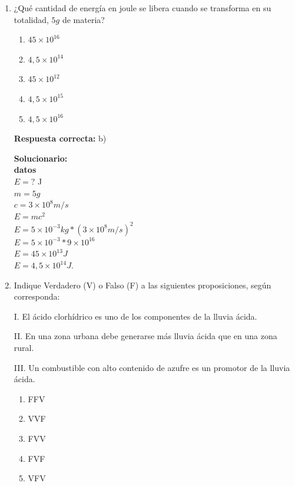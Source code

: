 \begin{enumerate}
	
	
	\item ¿Qué cantidad de energía en joule se libera cuando se transforma en su totalidad, $5g$ de materia?
	
	\begin{enumerate}[label=\alph*)]
		\item $45 \times 10^{16}$
		\item $4,5 \times 10^{14}$
		\item $45 \times 10^{12}$
		\item $4,5 \times 10^{15}$
		\item $4,5 \times 10^{16}$
	\end{enumerate}
	
	\textbf{Respuesta correcta:} b)
	
	\vspace{2mm}
	\textbf{Solucionario:}\\
	\textbf{datos} \\
	$E = ?$ J \\
	$m = 5g$ \\
	$c = 3 \times 10^8 m/s$\\

	$E = mc^2$ \\
	$E = 5 \times 10^{-3} kg * (3 \times 10^8 m/s)^2$ \\
	$E = 5 \times 10^{-3} * 9 \times 10^{16}$ \\
	$E = 45 \times 10^{13} J$ \\
	$E = 4,5 \times 10^{14} J.$
	
	\vspace{6mm}
	
	\item Indique Verdadero (V) o Falso (F) a las siguientes proposiciones, según corresponda:
	
	I. El ácido clorhídrico es uno de los componentes de la lluvia ácida.
	
	II. En una zona urbana debe generarse más lluvia ácida que en una zona rural.
	
	III. Un combustible con alto contenido de azufre es un promotor de la lluvia ácida.
	
	\begin{enumerate}[label=\alph*)]
		\item FFV
		\item VVF
		\item FVV
		\item FVF
		\item VFV
	\end{enumerate}
	

\end{enumerate}
